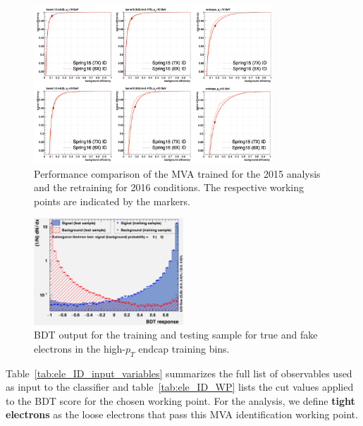 \begin{figure}[!htb]
\vspace*{0.3cm}
\begin{center}
\includegraphics[width=0.80\textwidth]{Figures/Electrons/ele_ROC.png}
\caption{Performance comparison of the MVA trained for the 2015 analysis and the retraining for 2016 conditions. 
The respective working points are indicated by the markers.
\label{fig:ele_ID_ROC}}
\end{center}
\end{figure}

\begin{figure}[!htb]
\vspace*{0.3cm}
\begin{center}
\includegraphics[width=0.5\textwidth]{Figures/Electrons/ele_overtraining.png}
\caption{BDT output for the training and testing sample for true and fake electrons in the high-$p_T$ endcap training bins.
\label{fig:ele_ID_BDT_output}}
\end{center}
\end{figure}

Table~\ref{tab:ele_ID_input_variables} summarizes the full list of observables used as input to the classifier
and table~\ref{tab:ele_ID_WP} lists the cut values applied to the BDT score for the chosen working point. 
For the analysis, we define {\bf tight electrons} as the loose electrons that pass this MVA identification working point. 

